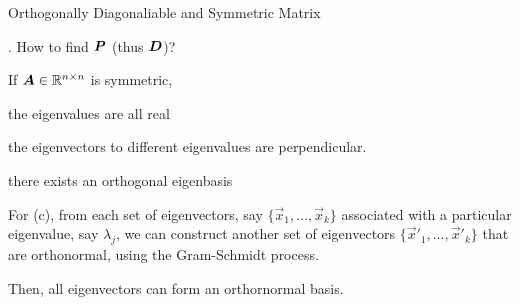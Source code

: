 \documentclass[handout,fleqn,aspectratio=169]{beamer}
\begin{document}
\begin{frame}{Orthogonally Diagonaliable and Symmetric Matrix}

\plitemsep 0.1in

\vspace{0.2cm}
\vspace{-0.3cm}
\bci

\item \question. How to find $\bm{P}$ (thus $\bm{D}$)?

\item {} If $\bm{A} \in {\mathbb R}^{n \times n}$ is symmetric, 
\bce[(a)]
\item the eigenvalues are all real 
\item the eigenvectors to different eigenvalues are perpendicular. 
\item there exists an orthogonal eigenbasis
\ece

\item For (c), from each set of eigenvectors, say $\{\vec{x}_1, \ldots, \vec{x}_k \}$ associated with a particular eigenvalue, say $\lambda_j$, we can construct another set of eigenvectors $\{\vec{x}'_1, \ldots, \vec{x}'_k \}$ that are orthonormal, using the Gram-Schmidt process.  

\item Then, all eigenvectors can form an orthornormal basis. 
\eci

\end{frame}
\end{document}
